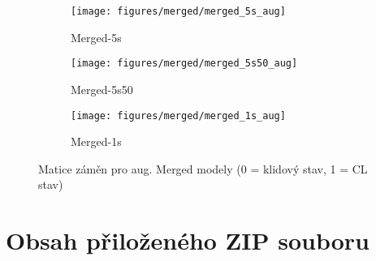 \begin{figure}[!htb]
    \centering
    \begin{subfigure}[h]{0.32\linewidth}
        \texttt{[image: figures/merged/merged\_5s\_aug]}
        \caption{Merged-5s}
    \end{subfigure}
    \hspace{0.05cm}
    \begin{subfigure}[h]{0.32\linewidth}
        \texttt{[image: figures/merged/merged\_5s50\_aug]}
        \caption{Merged-5s50}
    \end{subfigure}
    \hspace{0.05cm}
    \begin{subfigure}[h]{0.32\linewidth}
        \texttt{[image: figures/merged/merged\_1s\_aug]}
        \caption{Merged-1s}
    \end{subfigure}
    \caption{Matice záměn pro aug. Merged modely (0 = klidový stav, 1 = CL stav)}
    \vspace{-10mm}
\end{figure}

\chapter{Obsah přiloženého ZIP souboru}
\begin{figure}[h]
    \begin{minipage}{0.95\textwidth}
    \end{minipage}
\end{figure}